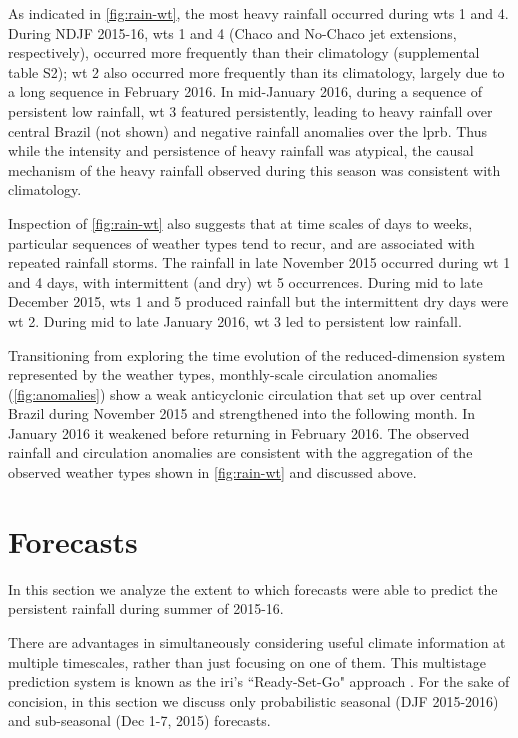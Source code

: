 \documentclass[twocol]{ametsoc}
\begin{document}
As indicated in \cref{fig:rain-wt}, the most heavy rainfall occurred during \glspl{wt} 1 and 4.
During NDJF 2015-16, \glspl{wt} 1 and 4 (Chaco and No-Chaco jet extensions, respectively),  occurred more frequently than their climatology (supplemental table S2); \gls{wt} 2 also occurred more frequently than its climatology, largely due to a long sequence in February 2016.
In mid-January 2016, during a sequence of persistent low rainfall, \gls{wt} 3 featured persistently, leading to heavy rainfall over central Brazil (not shown) and negative rainfall anomalies over the \gls{lprb}.
Thus while the intensity and persistence of heavy rainfall was atypical, the causal mechanism of the heavy rainfall observed during this season was consistent with climatology.

Inspection of \cref{fig:rain-wt} also suggests that at time scales of days to weeks, particular sequences of weather types tend to recur, and are associated with repeated rainfall storms.
The rainfall in late November 2015 occurred during \gls{wt} 1 and 4 days, with intermittent (and dry) \gls{wt} 5 occurrences.
During mid to late December 2015, \glspl{wt} 1 and 5 produced rainfall but the intermittent dry days were \gls{wt} 2.
During mid to late January 2016, \gls{wt} 3 led to persistent low rainfall.

Transitioning from exploring the time evolution of the reduced-dimension system represented by the weather types, monthly-scale circulation anomalies (\cref{fig:anomalies}) show a weak anticyclonic circulation that set up over central Brazil during November 2015 and strengthened into the following month.
In January 2016 it weakened before returning in February 2016.
The observed rainfall and circulation anomalies are consistent with the aggregation of the observed weather types shown in \cref{fig:rain-wt} and discussed above.


\section{Forecasts} \label{sec:fcsts}

In this section we analyze the extent to which forecasts were able to predict the persistent rainfall during summer of 2015-16.

There are advantages in simultaneously considering useful climate information at multiple timescales, rather than just focusing on one of them.
This multistage prediction system is known as the \gls{iri}'s ``Ready-Set-Go" approach \citep{Hellmuth2011,Goddard2014}.
For the sake of concision, in this section we discuss only probabilistic seasonal (DJF 2015-2016) and sub-seasonal (Dec 1-7, 2015) forecasts.
\end{document}

